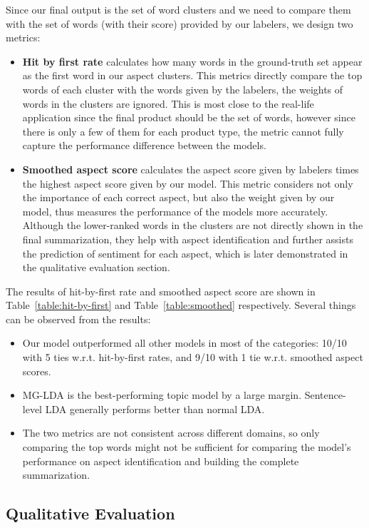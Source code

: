 Since our final output is the set of word clusters and we need to compare them with the set of words (with their score) provided by our labelers, we design two metrics:
\begin{itemize}
    \item \textbf{Hit by first rate} calculates how many words in the ground-truth set appear as the first word in our aspect clusters. This metrics directly compare the top words of each cluster with the words given by the labelers, the weights of words in the clusters are ignored. This is most close to the real-life application since the final product should be the set of words, however since there is only a few of them for each product type, the metric cannot fully capture the performance difference between the models.

    \item \textbf{Smoothed aspect score} calculates the aspect score given by labelers times the highest aspect score given by our model. This metric considers not only the importance of each correct aspect, but also the weight given by our model, thus measures the performance of the models more accurately. Although the lower-ranked words in the clusters are not directly shown in the final summarization, they help with aspect identification and further assists the prediction of sentiment for each aspect, which is later demonstrated in the qualitative evaluation section. 
\end{itemize}

The results of hit-by-first rate and smoothed aspect score are shown in Table~\ref{table:hit-by-first} and Table~\ref{table:smoothed} respectively. Several things can be observed from the results:

\begin{itemize}
    \item Our model outperformed all other models in most of the categories: 10/10 with 5 ties w.r.t. hit-by-first rates, and 9/10 with 1 tie w.r.t. smoothed aspect scores.
    \item MG-LDA is the best-performing topic model by a large margin. Sentence-level LDA generally performs better than normal LDA.
    \item The two metrics are not consistent across different domains, so only comparing the top words might not be sufficient for comparing the model's performance on aspect identification and building the complete summarization.
\end{itemize}

\subsection{Qualitative Evaluation}

